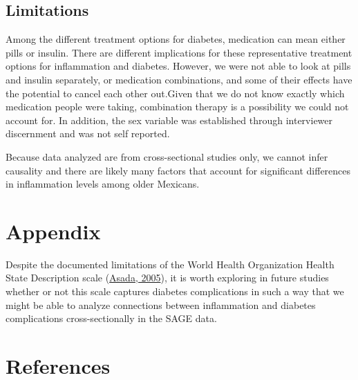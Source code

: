 \documentclass[
  man]{apa6}
\begin{document}
\hypertarget{limitations}{%
\subsection{Limitations}\label{limitations}}

Among the different treatment options for diabetes, medication can mean either pills or insulin. There are different implications for these representative treatment options for inflammation and diabetes. However, we were not able to look at pills and insulin separately, or medication combinations, and some of their effects have the potential to cancel each other out.Given that we do not know exactly which medication people were taking, combination therapy is a possibility we could not account for. In addition, the sex variable was established through interviewer discernment and was not self reported.

Because data analyzed are from cross-sectional studies only, we cannot infer causality and there are likely many factors that account for significant differences in inflammation levels among older Mexicans.

\newpage

\hypertarget{appendix}{%
\section{Appendix}\label{appendix}}

Despite the documented limitations of the World Health Organization Health State Description scale (\protect\hyperlink{ref-asadaMedicalTechnologiesNonhuman2005}{Asada, 2005}), it is worth exploring in future studies whether or not this scale captures diabetes complications in such a way that we might be able to analyze connections between inflammation and diabetes complications cross-sectionally in the SAGE data.

\newpage

\hypertarget{references}{%
\section{References}\label{references}}
\end{document}

